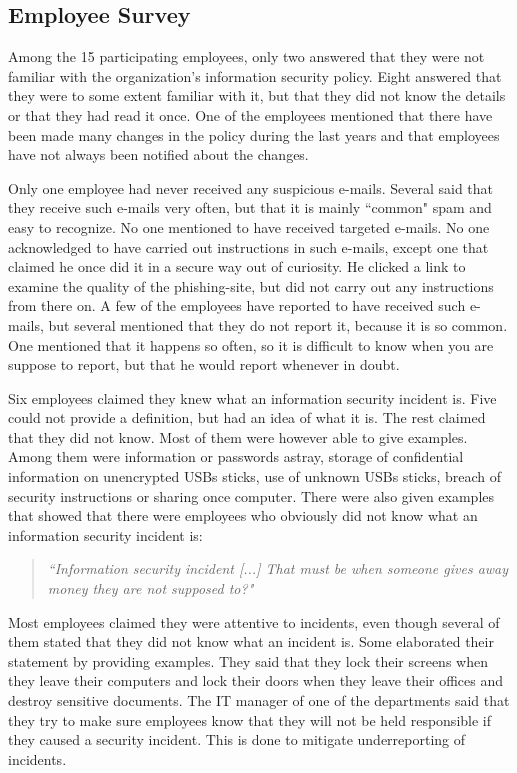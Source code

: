 \subsection{Employee Survey}
Among the 15 participating employees, only two answered that they were not familiar with the organization's information security policy. Eight answered that they were to some extent familiar with it, but that they did not know the details or that they had read it once. One of the employees mentioned that there have been made many changes in the policy during the last years and that employees have not always been notified about the changes.

Only one employee had never received any suspicious e-mails. Several said that they receive such e-mails very often, but that it is mainly ``common" spam and easy to recognize. No one mentioned to have received targeted e-mails. No one acknowledged to have carried out instructions in such e-mails, except one that claimed he once did it in a secure way out of curiosity. He clicked a link to examine the quality of the phishing-site, but did not carry out any instructions from there on. A few of the employees have reported to have received such e-mails, but several mentioned that they do not report it, because it is so common. One mentioned that it happens so often, so it is difficult to know when you are suppose to report, but that he would report whenever in doubt.

Six employees claimed they knew what an information security incident is. Five could not provide a definition, but had an idea of what it is. The rest claimed that they did not know. Most of them were however able to give examples. Among them were information or passwords astray, storage of confidential information on unencrypted \acsp{USB} sticks, use of unknown \acsp{USB} sticks, breach of security instructions or sharing once computer. There were also given examples that showed that there were employees who obviously did not know what an information security incident is:

\begin{quote}
\textit{``Information security incident [...] That must be when someone gives away money they are not supposed to?"}
\end{quote}

Most employees claimed they were attentive to incidents, even though several of them stated that they did not know what an incident is. Some elaborated their statement by providing examples. They said that they lock their screens when they leave their computers and lock their doors when they leave their offices and destroy sensitive documents. The IT manager of one of the departments said that they try to make sure employees know that they will not be held responsible if they caused a security incident. This is done to mitigate underreporting of incidents.

